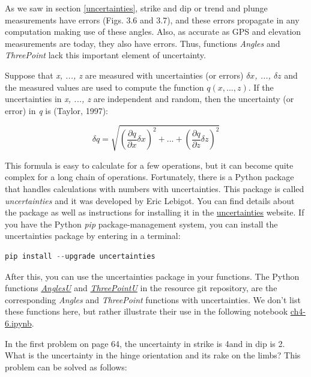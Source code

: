 \documentclass[a4paper , 12pt]{book}
\begin{document}
As we saw in section \ref{uncertainties}, strike and dip or trend and plunge measurements have errors (Figs. 3.6 and 3.7), and these errors  propagate in any computation making use of these angles. Also, as accurate as GPS and elevation measurements are today, they also have errors. Thus, functions \textit{Angles} and \textit{ThreePoint} lack this important element of uncertainty.

Suppose that \textit{x, ..., z} are measured with uncertainties (or errors) \textit{$\delta x$, ..., $\delta z$} and the measured values are used to compute the function $q(x,...,z)$. If the uncertainties in \textit{x, ..., z} are independent and random, then the uncertainty (or error) in \textit{q} is (Taylor, 1997):

\begin{equation}
    \delta q=\sqrt{\left(\frac{\partial q}{\partial x}\delta x \right)^2+...+\left(\frac{\partial q}{\partial z}\delta z \right)^2}\tag{4.16}
\end{equation}

This formula is easy to calculate for a few operations, but it can become quite complex for a long chain of operations. Fortunately, there is a Python package that handles calculations with numbers with uncertainties. This package is called \textit{uncertainties} and it was developed by Eric Lebigot. You can find details about the package as well as instructions for installing it in the \href{https://pythonhosted.org/uncertainties/}{uncertainties} website. If you have the Python \textit{pip} package-management system, you can install the uncertainties package by entering in a terminal:

\begin{center}
\begin{lstlisting}[language=Python, frame=single]
pip install --upgrade uncertainties
\end{lstlisting}
\end{center}

After this, you can use the uncertainties package in your functions. The Python functions \href{http://github.com}{\textit{AnglesU}} and \href{http://github.com}{\textit{ThreePointU}} in the resource git repository, are the corresponding \textit{Angles} and \textit{ThreePoint} functions with uncertainties. We don't list these functions here, but rather illustrate their use in the following notebook \href{http://github.com}{ch4-6.ipynb}.

In the first problem on page 64, the uncertainty in strike is 4\degree and in dip is 2\degree. What is the uncertainty in the hinge orientation and its rake on the limbs? This problem can be solved as follows:
\end{document}
